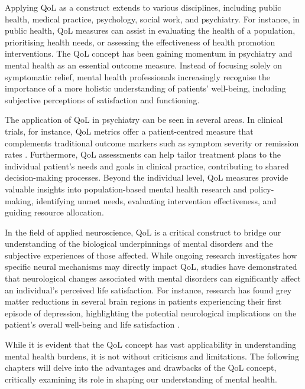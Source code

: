 \documentclass[10pt]{article}
\begin{document}
\begin{sloppypar}
  Applying QoL as a construct extends to various disciplines, including public health, medical practice, psychology, social work, and psychiatry. For instance, in public health, QoL measures can assist in evaluating the health of a population, prioritising health needs, or assessing the effectiveness of health promotion interventions. The QoL concept has been gaining momentum in psychiatry and mental health as an essential outcome measure. Instead of focusing solely on symptomatic relief, mental health professionals increasingly recognise the importance of a more holistic understanding of patients' well-being, including subjective perceptions of satisfaction and functioning.

  The application of QoL in psychiatry can be seen in several areas. In clinical trials, for instance, QoL metrics offer a patient-centred measure that complements traditional outcome markers such as symptom severity or remission rates \citep{malla_first-episode_2005}. Furthermore, QoL assessments can help tailor treatment plans to the individual patient's needs and goals in clinical practice, contributing to shared decision-making processes. Beyond the individual level, QoL measures provide valuable insights into population-based mental health research and policy-making, identifying unmet needs, evaluating intervention effectiveness, and guiding resource allocation.

  In the field of applied neuroscience, QoL is a critical construct to bridge our understanding of the biological underpinnings of mental disorders and the subjective experiences of those affected. While ongoing research investigates how specific neural mechanisms may directly impact QoL, studies have demonstrated that neurological changes associated with mental disorders can significantly affect an individual's perceived life satisfaction. For instance, research has found grey matter reductions in several brain regions in patients experiencing their first episode of depression, highlighting the potential neurological implications on the patient's overall well-being and life satisfaction \citep{zhang_brain_2016}.

  While it is evident that the QoL concept has vast applicability in understanding mental health burdens, it is not without criticisms and limitations. The following chapters will delve into the advantages and drawbacks of the QoL concept, critically examining its role in shaping our understanding of mental health.

  \pagebreak
  \singlespacing %
  
  

\end{sloppypar}
\end{document}
